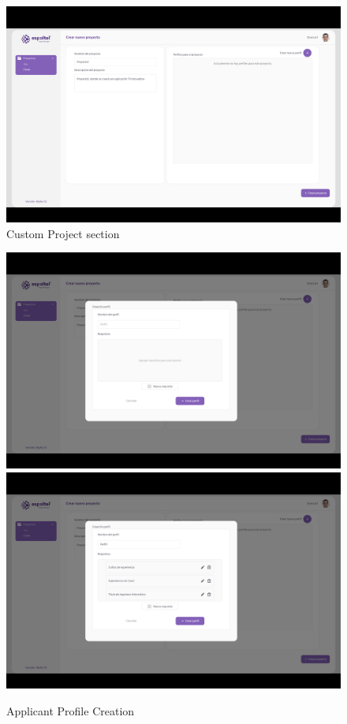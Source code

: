 \documentclass{scrreprt}
\begin{document}
\begin{figure}[H]
    
    \centering \small
    \includegraphics[width=1\textwidth]{WebPrototype/Director_flow2.png}
    \caption{Custom Project section}
\end{figure} 
\begin{figure}[H]
    
    \centering \small
    \includegraphics[width=1\textwidth]{WebPrototype/Director_flow3.png}
    \includegraphics[width=1\textwidth]{WebPrototype/Director_flow31.png}    
    \caption{Applicant Profile Creation}
\end{figure} 
\end{document}
